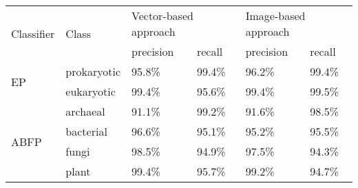 \begin{table}[h]
\scriptsize
\centering
\begin{tabular}{|l||l|l|l|l|l|}
\hline
\multirow{2}{*}{Classifier} & \multirow{2}{*}{Class} & \multicolumn{2}{l|}{Vector-based approach} & \multicolumn{2}{l|}{Image-based approach} \\ \cline{3-6} 
                            &                        & precision         & recall        & precision        & recall        \\ \hline \hline
\multirow{2}{*}{EP}         & prokaryotic            & 95.8\%            & 99.4\%        & 96.2\%           & 99.4\%        \\ \cline{2-6} 
                            & eukaryotic             & 99.4\%            & 95.6\%        & 99.4\%           & 99.5\%        \\ \hline \hline
\multirow{4}{*}{ABFP}       & archaeal               & 91.1\%            & 99.2\%        & 91.6\%           & 98.5\%        \\ \cline{2-6} 
                            & bacterial              & 96.6\%            & 95.1\%        & 95.2\%           & 95.5\%        \\ \cline{2-6} 
                            & fungi                  & 98.5\%            & 94.9\%        & 97.5\%           & 94.3\%        \\ \cline{2-6} 
                            & plant                  & 99.4\%            & 95.7\%        & 99.2\%           & 94.7\%        \\ \hline
\end{tabular}
\end{table}
